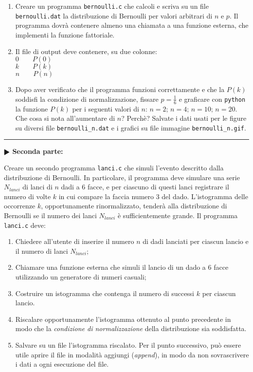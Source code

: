 \documentclass[11pt]{article}
\begin{document}
\begin{enumerate}
\item Creare un programma \texttt{bernoulli.c} che calcoli e scriva su un file \texttt{bernoulli.dat} la
distribuzione di Bernoulli per valori arbitrari di $n$ e $p$. Il programma dovr\`a contenere almeno
una chiamata a una funzione esterna, che implementi la funzione fattoriale.
\item Il file di output deve contenere, su due colonne:
\\
\texttt{$0 \quad \quad P(0)$}
\\
\texttt{$k \quad \quad P(k)$}
\\
\texttt{$n \quad \quad P(n)$}

\item Dopo aver verificato che il programma funzioni correttamente e che la $P(k)$ soddisfi la condizione di
  normalizzazione, fissare $p=\frac{1}{6}$ e graficare con \texttt{python} la funzione $P(k)$ per i seguenti valori di $n$:
$n=2$; $n=4$; $n=10$; $n=20$.
Che cosa si nota all'aumentare di $n$? Perch\`e?
Salvate i dati usati per le figure su diversi file \texttt{bernoulli\_n.dat} e i grafici su file immagine
\texttt{bernoulli\_n.gif}.
\end{enumerate}

\hrule
\vspace{2mm}
\textbf{$\RHD$ Seconda parte:}
\vspace{2mm}

Creare un secondo programma \texttt{lanci.c} che simuli l'evento descritto dalla distribuzione di Bernoulli.
In particolare, il programma deve simulare una serie $N_{lanci}$ di lanci di $n$ dadi a 6 facce, e per
ciascuno di questi lanci registrare il numero di volte $k$ in cui compare la faccia numero 3 del dado.
L'istogramma delle occorrenze $k$, opportunamente rinormalizzato, tender\`a alla distribuzione di 
Bernoulli se il numero dei lanci $N_{lanci}$ \`e sufficientemente grande.
Il programma \texttt{lanci.c} deve:

\begin{enumerate}
\item Chiedere all'utente di inserire il numero $n$ di dadi lanciati per ciascun lancio e il numero di lanci $N_{lanci}$;
\item Chiamare una funzione esterna che simuli il lancio di un dado a 6 facce utilizzando un generatore di numeri casuali;
\item Costruire un istogramma che contenga il numero di successi $k$ per ciascun lancio.
\item Riscalare opportunamente l'istogramma ottenuto al punto precedente in modo che la {\em condizione di normalizzazione\/} della distribuzione sia soddisfatta.
\item Salvare su un file l'istogramma riscalato. Per il punto successivo, pu\`o essere utile aprire il file in modalit\`a aggiungi ({\em append\/}), in modo da non sovrascrivere i dati a ogni esecuzione del file.
\end{enumerate}
\end{document}

